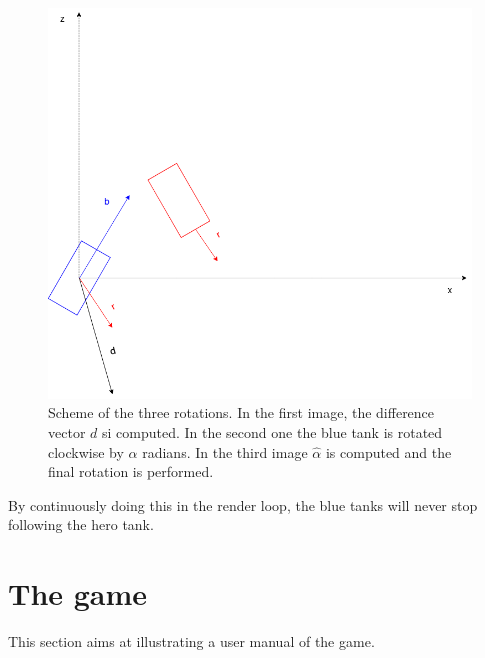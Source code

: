\documentclass[14pt]{article}
\begin{document}
\begin{figure}[H]
\begin{minipage}[t]{0.6\textwidth}
\end{minipage}
\begin{minipage}[t]{0.6\textwidth}
\center
\includegraphics[width=\textwidth]{diagrams/chartSecondRot.png}
\end{minipage}
\caption{Scheme of the three rotations. In the first image, the difference vector \(d\) si computed. In the second one the blue tank is rotated clockwise by \(\alpha\) radians. In the third image \(\hat{\alpha}\) is computed and the final rotation is performed.}
\label{img:threeOrientations}
\end{figure}




By continuously doing this in the render loop, the blue tanks will never stop following the hero tank. 
\section{The game}\label{sec:theGame}
This section aims at illustrating a user manual of the game. 
\end{document}
